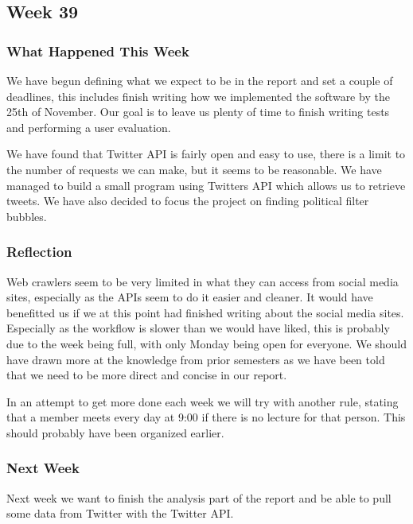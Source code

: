 \subsection{Week 39}
\subsubsection{What Happened This Week}
We have begun defining what we expect to be in the report and set a couple of
deadlines, this includes finish writing how we implemented the software by the
25th of November. Our goal is to leave us plenty of time to finish writing
tests and performing a user evaluation.\nl

We have found that Twitter \ac{API} is fairly open and easy to use, there is a
limit to the number of requests we can make, but it seems to be reasonable. We
have managed to build a small program using Twitters API which allows us to
retrieve tweets. We have also decided to focus the project on finding political
filter bubbles.

\subsubsection{Reflection}
Web crawlers seem to be very limited in what they can access from social media
sites, especially as the APIs seem to do it easier and cleaner. It would have
benefitted us if we at this point had finished writing about the social media
sites. Especially as the workflow is slower than we would have liked, this is
probably due to the week being full, with only Monday being open for everyone.
We should have drawn more at the knowledge from prior semesters as we have been
told that we need to be more direct and concise in our report.\nl

In an attempt to get more done each week we will try with another rule, stating
that a member meets every day at 9:00 if there is no lecture for that person.
This should probably have been organized earlier.

\subsubsection{Next Week}
Next week we want to finish the analysis part of the report and be able to pull
some data from Twitter with the Twitter \ac{API}.
	



